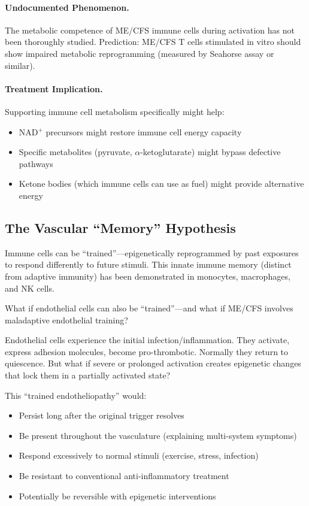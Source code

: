 \paragraph{Undocumented Phenomenon.} The metabolic competence of ME/CFS immune cells during activation has not been thoroughly studied. Prediction: ME/CFS T cells stimulated in vitro should show impaired metabolic reprogramming (measured by Seahorse assay or similar).

\paragraph{Treatment Implication.} Supporting immune cell metabolism specifically might help:
\begin{itemize}
    \item NAD$^+$ precursors might restore immune cell energy capacity
    \item Specific metabolites (pyruvate, $\alpha$-ketoglutarate) might bypass defective pathways
    \item Ketone bodies (which immune cells can use as fuel) might provide alternative energy
\end{itemize}

\subsection{The Vascular ``Memory'' Hypothesis}

\begin{open_question}
Immune cells can be ``trained''---epigenetically reprogrammed by past exposures to respond differently to future stimuli. This innate immune memory (distinct from adaptive immunity) has been demonstrated in monocytes, macrophages, and NK cells.

What if endothelial cells can also be ``trained''---and what if ME/CFS involves maladaptive endothelial training?

Endothelial cells experience the initial infection/inflammation. They activate, express adhesion molecules, become pro-thrombotic. Normally they return to quiescence. But what if severe or prolonged activation creates epigenetic changes that lock them in a partially activated state?

This ``trained endotheliopathy'' would:
\begin{itemize}
    \item Persist long after the original trigger resolves
    \item Be present throughout the vasculature (explaining multi-system symptoms)
    \item Respond excessively to normal stimuli (exercise, stress, infection)
    \item Be resistant to conventional anti-inflammatory treatment
    \item Potentially be reversible with epigenetic interventions
\end{itemize}
\end{open_question}


